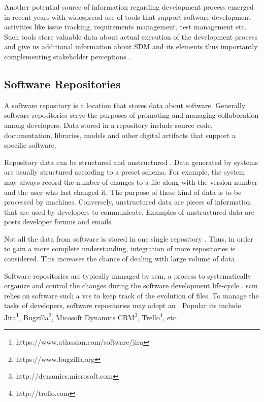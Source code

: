 Another potential source of information regarding development process emerged in recent years with widespread use of tools that support software development activities like issue tracking, requirements management, test management etc. Such tools store valuable data about actual execution of the development process and give us additional information about SDM and its elements thus importantly complementing stakeholder perceptions \citep{DBLP:journals/ese/ChoetkiertikulD17,DBLP:conf/msr/MantylaADGO16,DBLP:conf/msr/OrtuMDTTMA16,DBLP:conf/icse/OrtuDKM15}. 



\subsection{Software Repositories}



A software repository is a location that stores data about software. 
Generally software repositories serve the purposes of promoting and managing collaboration among developers. Data stored in a repository include source code, documentation, libraries, models and other digital artifacts that support a specific software. 

Repository data can be structured and unstructured \citep{DBLP:books/el/16/Bacchelli16,DBLP:conf/wcre/Bavota16}. Data generated by systems are usually structured according to a preset schema. For example, the system may always record the number of changes to a file along with the version number and the user who last changed it. The purpose of these kind of data is to be processed by machines. Conversely, unstructured data are pieces of information that are used by developers to communicate. Examples of unstructured data are posts developer forums and emails. 

Not all the data from software is stored in one single repository \citep{DBLP:journals/ese/KalliamvakouGBS16}. Thus, in order to gain a more complete understanding, integration of more repositories is considered. 
This increases the chance of dealing with large volume of data \citep{DBLP:journals/tosem/0001NRN15,DBLP:journals/jossw/Boettiger18,DBLP:conf/wcre/BoldiPVZ20}.
 
Software repositories are typically managed by \gls{scm}, a process to systematically organize and control the changes during the software development life-cycle \citep{DBLP:conf/icse/Estublier00}. \Gls{scm} relies on software such a \gls{vcs} to keep track of the evolution of files. 
To manage the tasks of developers, software repositories may adopt an  \citep{DBLP:conf/cscw/BertramVGW10}. Popular \gls{its} include Jira\footnote{https://www.atlassian.com/software/jira}, Bugzilla\footnote{https://www.bugzilla.org}, Micosoft Dynamics CRM\footnote{http://dynamics.microsoft.com}, Trello\footnote{http://trello.com}, etc. 

